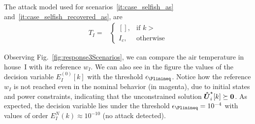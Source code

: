 \documentclass[../main.tex]{subfiles}
\begin{document}
The attack model used for scenarios~\ref{it:case_selfish_as} and~\ref{it:case_selfish_recovered_as},
are
\begin{align}
  T_{I}=&\begin{cases}
          \left[\right],&\text{if }k> \\
          I_{c},&\text{otherwise}
        \end{cases}
\end{align}

Observing Fig.~\ref{fig:response3Scenarios}, we can compare the air temperature in house~I
with its reference $w_{I}$.
We can also see in the figure the values of the decision variable ${E_{I}^{(0)}[k]}$ with the threshold $\epsilon_{\Plinineq}$.
Notice how the reference $w_{I}$ is not reached even in the nominal behavior (in magenta),
due to initial states and power constraints, indicating that the unconstrained solution $\optuncUik\succeq\0$.
As expected, the decision variable lies under the threshold ${\epsilon_{\Plinineq}=10^{-4}}$ with values of order ${E_{I}^{N}(k)\approx10^{-10}}$ (no attack detected).
\end{document}
